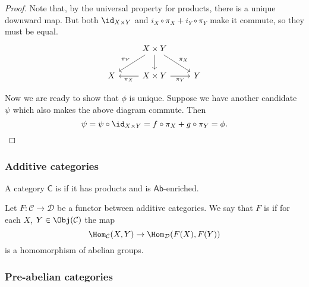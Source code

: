 \documentclass[main.tex]{subfiles}
\begin{document}
\begin{proof}
  Note that, by the universal property for products, there is a unique downward map. But both $\id_{X \times Y}$ and $i_{X} \circ \pi_{X} + i_{Y} \circ \pi_{Y}$ make it commute, so they must be equal.
  \begin{equation*}
    \begin{tikzcd}
      & X \times Y
      \arrow[dr, "\pi_{X}"]
      \arrow[dl, swap, "\pi_{Y}"]
      \arrow[d]
      \\
      X
      & X \times Y
      \arrow[r, swap, "\pi_{Y}"]
      \arrow[l, "\pi_{X}"]
      & Y
    \end{tikzcd}
  \end{equation*}

  Now we are ready to show that $\phi$ is unique. Suppose we have another candidate $\psi$ which also makes the above diagram commute. Then
  \begin{equation*}
    \psi = \psi \circ \id_{X \times Y} = f \circ \pi_{X} + g \circ \pi_{Y} = \phi.
  \end{equation*}
\end{proof}

\subsubsection{Additive categories}

\begin{definition}
  \label{def:additivecategory}
  A category $\mathsf{C}$ is  if it has products and is $\mathsf{Ab}$-enriched.
\end{definition}

\begin{definition}
  \label{def:additivefunctor}
  Let $F\colon \mathcal{C} \rightarrow \mathcal{D}$ be a functor between additive categories. We say that $F$ is  if for each $X$, $Y \in \Obj(\mathcal{C})$ the map
  \begin{equation*}
    \Hom_{\mathcal{C}}(X, Y) \to \Hom_{\mathcal{D}}(F(X), F(Y))
  \end{equation*}
  is a homomorphism of abelian groups.
\end{definition}

\subsubsection{Pre-abelian categories}
\end{document}
